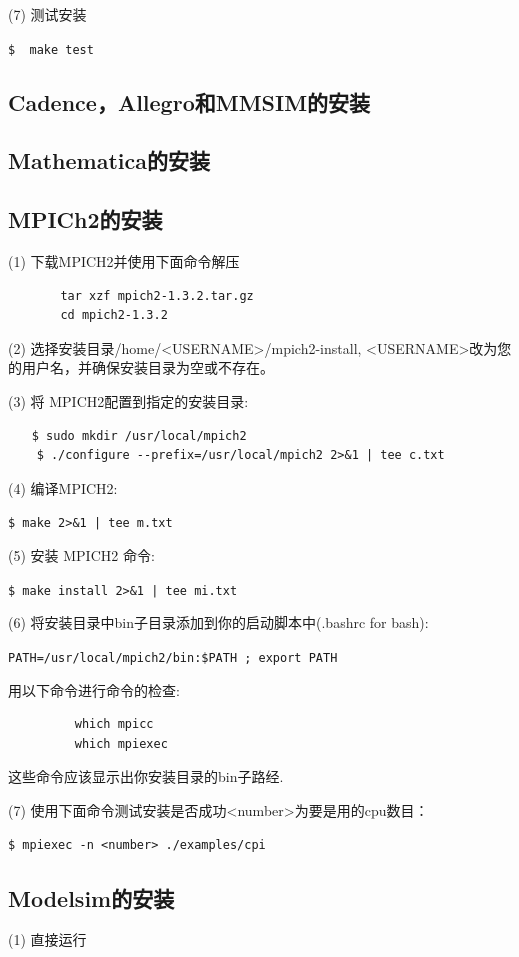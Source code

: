(7) 测试安装

\verb"$  make test"

\subsection{Cadence，Allegro和MMSIM的安装}

\subsection{Mathematica的安装}

\subsection{MPICh2的安装}
(1) 下载MPICH2并使用下面命令解压
\begin{verbatim}
　　    tar xzf mpich2-1.3.2.tar.gz
　　    cd mpich2-1.3.2
\end{verbatim}

(2) 选择安装目录/home/<USERNAME>/mpich2-install, <USERNAME>改为您的用户名，并确保安装目录为空或不存在。

(3) 将 MPICH2配置到指定的安装目录:
\begin{verbatim}
　　$ sudo mkdir /usr/local/mpich2
    $ ./configure --prefix=/usr/local/mpich2 2>&1 | tee c.txt
\end{verbatim}

(4) 编译MPICH2:

\verb"$ make 2>&1 | tee m.txt"

(5) 安装 MPICH2 命令:

\verb"$ make install 2>&1 | tee mi.txt"

(6) 将安装目录中bin子目录添加到你的启动脚本中(.bashrc for bash):

\verb"PATH=/usr/local/mpich2/bin:$PATH ; export PATH"

用以下命令进行命令的检查:
\begin{verbatim}
　　      which mpicc
　　      which mpiexec
\end{verbatim}

这些命令应该显示出你安装目录的bin子路经.

(7) 使用下面命令测试安装是否成功<number>为要是用的cpu数目：

\verb"$ mpiexec -n <number> ./examples/cpi"

\subsection{Modelsim的安装}
(1) 直接运行

